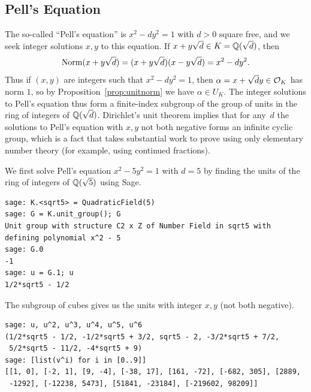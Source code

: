 \subsection{Pell's Equation}\label{sec:pell}
The so-called ``Pell's equation'' is $x^2-dy^2 = 1$ with $d>0$ square
free, and we seek integer solutions $x,y$ to this equation.  If
$x+y\sqrt{d}\in K = \mathbb{Q}(\sqrt{d})$, then
$$
  \operatorname{Norm}(x+y\sqrt{d}) = (x+y\sqrt{d})(x-y\sqrt{d}) = x^2 -dy^2.
$$ 
Thus if $(x,y)$ are integers such that $x^2 - d y^2 = 1$, then $\alpha
= x + \sqrt{d}y \in \mathcal{O}_K$ has norm $1$, so by
Proposition~\ref{prop:unitnorm} we have $\alpha \in U_K$.  The integer
solutions to Pell's equation thus form a finite-index subgroup of the
group of units in the ring of integers of $\mathbb{Q}(\sqrt{d})$.  Dirichlet's
unit theorem implies that for any~$d$ the solutions to Pell's equation
with $x,y$ not both negative forms an infinite cyclic group, which is
a fact that takes substantial work to prove using only elementary
number theory (for example, using continued fractions).

We first solve Pell's equation $x^2 - 5y^2 = 1$ with $d=5$ by finding
the units of the ring of integers of $\mathbb{Q}(\sqrt{5})$ using Sage.

\begin{lstlisting}
sage: K.<sqrt5> = QuadraticField(5)
sage: G = K.unit_group(); G
Unit group with structure C2 x Z of Number Field in sqrt5 with 
defining polynomial x^2 - 5
sage: G.0
-1
sage: u = G.1; u
1/2*sqrt5 - 1/2
\end{lstlisting}

The subgroup of cubes gives us the units with integer $x,y$ (not both negative).

\begin{lstlisting}
sage: u, u^2, u^3, u^4, u^5, u^6
(1/2*sqrt5 - 1/2, -1/2*sqrt5 + 3/2, sqrt5 - 2, -3/2*sqrt5 + 7/2, 
 5/2*sqrt5 - 11/2, -4*sqrt5 + 9)
sage: [list(v^i) for i in [0..9]]
[[1, 0], [-2, 1], [9, -4], [-38, 17], [161, -72], [-682, 305], [2889, 
 -1292], [-12238, 5473], [51841, -23184], [-219602, 98209]]
\end{lstlisting}



